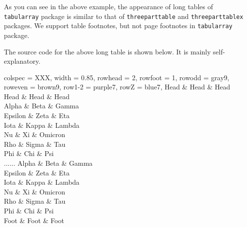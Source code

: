 \documentclass[oneside]{book}
\begin{document}
As you can see in the above example, the appearance of long tables of \verb!tabularray! package
is similar to that of \verb!threeparttable! and \verb!threeparttablex! packages.
We support table footnotes, but not page footnotes in \verb!tabularray! package.

\newpage

The source code for the above long table is shown below. It is mainly self-explanatory.

\begin{codehigh}
\begin{longtblr}[
  theme = fancy,
  caption = {A Long Long Long Long Long Long Long Table},
  entry = {Short Caption},
  label = {tblr:test},
  note{a} = {It is the first footnote.},
  note{$\dag$} = {It is the second long long long long long long footnote.},
  remark{Note} = {Some general note. Some general note. Some general note.},
  remark{Source} = {Made up by myself. Made up by myself. Made up by myself.},
]{
  colspec = {XXX}, width = 0.85\linewidth,
  rowhead = 2, rowfoot = 1,
  row{odd} = {gray9}, row{even} = {brown9},
  row{1-2} = {purple7}, row{Z} = {blue7},
}
\hline
 Head    & Head  & Head    \\
\hline
 Head    & Head  & Head    \\
\hline
 Alpha   & Beta  & Gamma   \\
\hline
 Epsilon & Zeta       & Eta    \\
\hline
 Iota    & Kappa\TblrNote{$\dag$} & Lambda \\
\hline
 Nu      & Xi    & Omicron \\
\hline
 Rho     & Sigma & Tau     \\
\hline
 Phi     & Chi   & Psi     \\
\hline
......
\hline
 Alpha   & Beta  & Gamma   \\
\hline
 Epsilon & Zeta  & Eta     \\
\hline
 Iota    & Kappa & Lambda  \\
\hline
 Nu      & Xi    & Omicron \\
\hline
 Rho     & Sigma & Tau     \\
\hline
 Phi     & Chi   & Psi     \\
\hline
 Foot    & Foot  & Foot    \\
\hline
\end{longtblr}
\end{codehigh}
\end{document}
